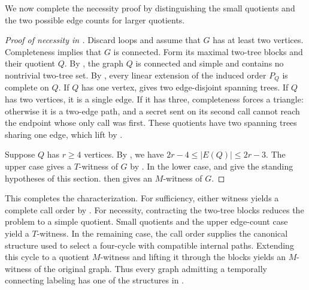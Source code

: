 \documentclass[USenglish, a4paper, thm-restate,numberwithinsect, cleveref]{lipics-v2021}
\begin{document}
We now complete the necessity proof by distinguishing the small
quotients and the two possible edge counts for larger quotients.

\begin{proof}[Proof of necessity in ]
Discard loops and assume that $G$ has at least two vertices.
Completeness implies that $G$ is connected. Form its maximal
two-tree blocks and their quotient $Q$. By
, the graph $Q$ is connected and
simple and contains no nontrivial two-tree set. By
, every linear extension of
the induced order $P_Q$ is complete on $Q$. If $Q$ has one vertex,
 gives two edge-disjoint spanning trees.
If $Q$ has two vertices, it is a single edge. If it has three,
completeness forces a triangle: otherwise it is a two-edge path,
and a secret sent on its second call cannot reach the endpoint
whose only call was first. These quotients have two
spanning trees sharing one edge, which lift by
.

Suppose $Q$ has $r\ge4$ vertices. By
,
we have $2r-4\le |E(Q)|\le2r-3$. The upper case gives a $T$-witness of $G$ by
. In the lower case,
 and
 give the standing hypotheses
of this section.  then
gives an $M$-witness of $G$.
\end{proof}



This completes the characterization. For sufficiency, either witness
yields a complete call order by . For
necessity, contracting the two-tree blocks reduces the problem to a
simple quotient. Small quotients and the upper edge-count case yield
a $T$-witness. In the remaining case, the call order supplies the
canonical structure used to select a four-cycle with compatible
internal paths. Extending this cycle to a quotient $M$-witness and
lifting it through the blocks yields an $M$-witness of the original
graph. Thus every graph admitting a temporally connecting labeling
has one of the structures in .



\end{document}
